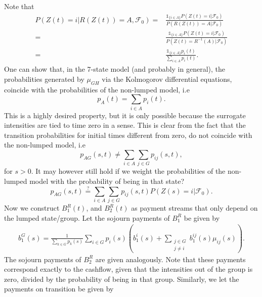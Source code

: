 \documentclass[12pt]{article}
\newcommand{\E}{\text{E}}
\newcommand{\indic}[1]{\mathds{1}_{ \{ #1 \} }}
\renewcommand{\P}{\text{P}}
\theoremstyle{my_thm}
\theoremstyle{my_def}
\theoremstyle{my_thm2}
\begin{document}
Note that
\begin{align*}
P(Z(t)=i|R(Z(t))=A,\mathcal{F}_0)=&\frac{\indic{i \in A} P(Z(t)=i|\mathcal{F}_0)}{P(R(Z(t))=A|\mathcal{F}_0)}
\\
=&
\frac{\indic{i \in A} P(Z(t)=i|\mathcal{F}_0)}{P(Z(t)=R^{-1}(A)|\mathcal{F}_0)}
\\
=&
\frac{\indic{i \in A} p_i(t)}{\sum_{i \in A}p_i(t)}.
\end{align*}
One can show that, in the 7-state model (and probably in general), the probabilities generated by $\mu_{GH}$ via the Kolmogorov differential equations, coincide with the probabilities of the non-lumped model, i.e
$$
p_A(t)=\sum_{i \in A} p_i(t).
$$
This is a highly desired property, but it is only possible because the surrogate intensities are tied to time zero in a sense. This is clear from the fact that the transition probabilities for initial times different from zero, do not coincide with the non-lumped model, i.e 
$$
p_{AG}(s,t) \neq \sum_{i \in A}\sum_{j \in G} p_{ij}(s,t),
$$
for $s>0$. It may however still hold if we weight the probabilities of the non-lumped model with the probability of being in that state?
$$
p_{AG}(s,t) \overset{?}{=} \sum_{i \in A}\sum_{j \in G} p_{ij}(s,t)P(Z(s)=i|\mathcal{F}_0).
$$
Now we construct $B_1^R(t)$, and $B_2^R(t)$ as payment streams that only depend on the lumped state/group. Let the sojourn payments of $B_1^R$ be given by
\begin{align*}
b_1^G(s)=\frac{1}{\sum_{k \in G}p_k(s)} \sum_{i \in G} p_i(s) \left( b_1^i(s) + \sum_{ \substack{j \in G \\j \neq i}} b_1^{ij}(s) \mu_{ij}(s) \right).
\end{align*}
The sojourn payments of $B_2^R$ are given analogously. Note that these payments correspond exactly to the cashflow, given that the intensities out of the group is zero, divided by the probability of being in that group. Similarly, we let the payments on transition be given by
\end{document}
